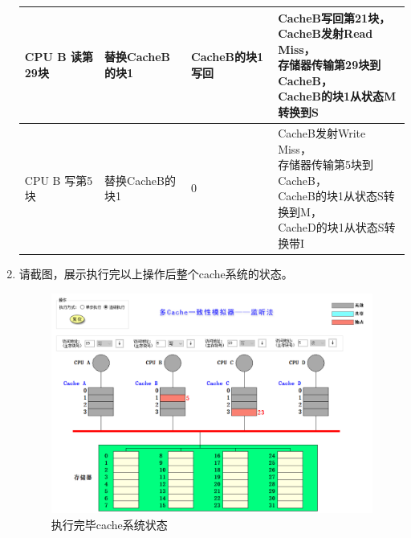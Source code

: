 \documentclass{ctexart}
\makeatletter
\newcommand{\tabincell}[2]{\begin{tabular}{@{}#1@{}}#2\end{tabular}}
\makeatother
\begin{document}
\begin{enumerate}
\begin{longtable}{|l|l|l|l|}
        CPU B 读第29块 & 替换CacheB的块1  & CacheB的块1写回 & \tabincell{l}{CacheB写回第21块，\\CacheB发射Read Miss，\\存储器传输第29块到CacheB，\\CacheB的块1从状态M转换到S}                   \\ \hline
        CPU B 写第5块  & 替换CacheB的块1  & 0           & \tabincell{l}{CacheB发射Write Miss，\\存储器传输第5块到CacheB，\\CacheB的块1从状态S转换到M，\\CacheD的块1从状态S转换带I}              \\ \hline
    \end{longtable}
    \item 请截图，展示执行完以上操作后整个cache系统的状态。
          \par \begin{figure}[H]
              \centering
              \includegraphics[scale=0.3]{jtf.png}
              \caption{执行完毕cache系统状态}
          \end{figure}
\end{enumerate}
\end{document}
